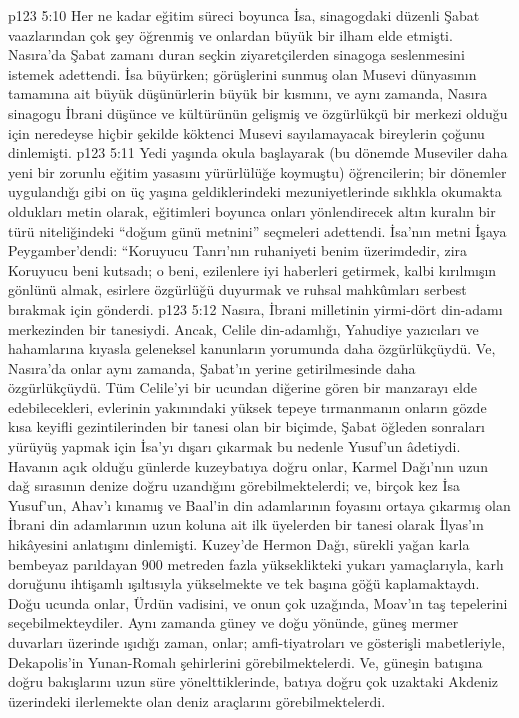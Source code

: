 \vs p123 5:10 Her ne kadar eğitim süreci boyunca İsa, sinagogdaki düzenli Şabat vaazlarından çok şey öğrenmiş ve onlardan büyük bir ilham elde etmişti. Nasıra’da Şabat zamanı duran seçkin ziyaretçilerden sinagoga seslenmesini istemek adettendi. İsa büyürken; görüşlerini sunmuş olan Musevi dünyasının tamamına ait büyük düşünürlerin büyük bir kısmını, ve aynı zamanda, Nasıra sinagogu İbrani düşünce ve kültürünün gelişmiş ve özgürlükçü bir merkezi olduğu için neredeyse hiçbir şekilde köktenci Musevi sayılamayacak bireylerin çoğunu dinlemişti.
\vs p123 5:11 Yedi yaşında okula başlayarak (bu dönemde Museviler daha yeni bir zorunlu eğitim yasasını yürürlülüğe koymuştu) öğrencilerin; bir dönemler uygulandığı gibi on üç yaşına geldiklerindeki mezuniyetlerinde sıklıkla okumakta oldukları metin olarak, eğitimleri boyunca onları yönlendirecek altın kuralın bir türü niteliğindeki “doğum günü metnini” seçmeleri adettendi. İsa’nın metni İşaya Peygamber’dendi: “Koruyucu Tanrı’nın ruhaniyeti benim üzerimdedir, zira Koruyucu beni kutsadı; o beni, ezilenlere iyi haberleri getirmek, kalbi kırılmışın gönlünü almak, esirlere özgürlüğü duyurmak ve ruhsal mahkûmları serbest bırakmak için gönderdi.
\vs p123 5:12 Nasıra, İbrani milletinin yirmi\hyp{}dört din\hyp{}adamı merkezinden bir tanesiydi. Ancak, Celile din\hyp{}adamlığı, Yahudiye yazıcıları ve hahamlarına kıyasla geleneksel kanunların yorumunda daha özgürlükçüydü. Ve, Nasıra’da onlar aynı zamanda, Şabat’ın yerine getirilmesinde daha özgürlükçüydü. Tüm Celile’yi bir ucundan diğerine gören bir manzarayı elde edebilecekleri, evlerinin yakınındaki yüksek tepeye tırmanmanın onların gözde kısa keyifli gezintilerinden bir tanesi olan bir biçimde, Şabat öğleden sonraları yürüyüş yapmak için İsa’yı dışarı çıkarmak bu nedenle Yusuf’un âdetiydi. Havanın açık olduğu günlerde kuzeybatıya doğru onlar, Karmel Dağı’nın uzun dağ sırasının denize doğru uzandığını görebilmektelerdi; ve, birçok kez İsa Yusuf’un, Ahav’ı kınamış ve Baal’in din adamlarının foyasını ortaya çıkarmış olan İbrani din adamlarının uzun koluna ait ilk üyelerden bir tanesi olarak İlyas’ın hikâyesini anlatışını dinlemişti. Kuzey’de Hermon Dağı, sürekli yağan karla bembeyaz parıldayan 900 metreden fazla yükseklikteki yukarı yamaçlarıyla, karlı doruğunu ihtişamlı ışıltısıyla yükselmekte ve tek başına göğü kaplamaktaydı. Doğu ucunda onlar, Ürdün vadisini, ve onun çok uzağında, Moav’ın taş tepelerini seçebilmekteydiler. Aynı zamanda güney ve doğu yönünde, güneş mermer duvarları üzerinde ışıdığı zaman, onlar; amfi\hyp{}tiyatroları ve gösterişli mabetleriyle, Dekapolis’in Yunan\hyp{}Romalı şehirlerini görebilmektelerdi. Ve, güneşin batışına doğru bakışlarını uzun süre yönelttiklerinde, batıya doğru çok uzaktaki Akdeniz üzerindeki ilerlemekte olan deniz araçlarını görebilmektelerdi.

